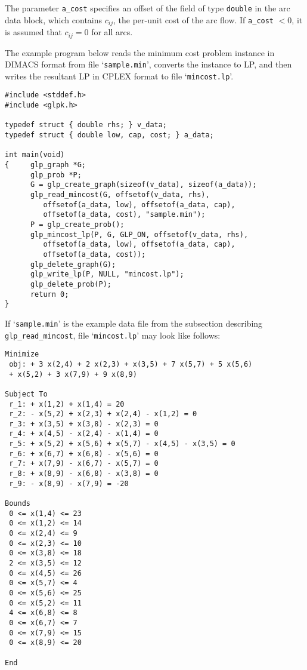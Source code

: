 \documentclass[11pt]{report}
\def\para#1{\noindent{\bf#1}}
\begin{document}
The parameter \verb|a_cost| specifies an offset of the field of type
\verb|double| in the arc data block, which contains $c_{ij}$, the
per-unit cost of the arc flow. If \verb|a_cost| $<0$, it is assumed that
$c_{ij}=0$ for all arcs.

\para{Example}

The example program below reads the minimum cost problem instance in
DIMACS format from file `\verb|sample.min|', converts the instance to
LP, and then writes the resultant LP in CPLEX format to file
`\verb|mincost.lp|'.

\begin{footnotesize}
\begin{verbatim}
#include <stddef.h>
#include <glpk.h>

typedef struct { double rhs; } v_data;
typedef struct { double low, cap, cost; } a_data;

int main(void)
{     glp_graph *G;
      glp_prob *P;
      G = glp_create_graph(sizeof(v_data), sizeof(a_data));
      glp_read_mincost(G, offsetof(v_data, rhs),
         offsetof(a_data, low), offsetof(a_data, cap),
         offsetof(a_data, cost), "sample.min");
      P = glp_create_prob();
      glp_mincost_lp(P, G, GLP_ON, offsetof(v_data, rhs),
         offsetof(a_data, low), offsetof(a_data, cap),
         offsetof(a_data, cost));
      glp_delete_graph(G);
      glp_write_lp(P, NULL, "mincost.lp");
      glp_delete_prob(P);
      return 0;
}
\end{verbatim}
\end{footnotesize}

If `\verb|sample.min|' is the example data file from the subsection
describing \verb|glp_read_mincost|, file `\verb|mincost.lp|' may look
like follows:

\begin{footnotesize}
\begin{verbatim}
Minimize
 obj: + 3 x(2,4) + 2 x(2,3) + x(3,5) + 7 x(5,7) + 5 x(5,6)
 + x(5,2) + 3 x(7,9) + 9 x(8,9)

Subject To
 r_1: + x(1,2) + x(1,4) = 20
 r_2: - x(5,2) + x(2,3) + x(2,4) - x(1,2) = 0
 r_3: + x(3,5) + x(3,8) - x(2,3) = 0
 r_4: + x(4,5) - x(2,4) - x(1,4) = 0
 r_5: + x(5,2) + x(5,6) + x(5,7) - x(4,5) - x(3,5) = 0
 r_6: + x(6,7) + x(6,8) - x(5,6) = 0
 r_7: + x(7,9) - x(6,7) - x(5,7) = 0
 r_8: + x(8,9) - x(6,8) - x(3,8) = 0
 r_9: - x(8,9) - x(7,9) = -20

Bounds
 0 <= x(1,4) <= 23
 0 <= x(1,2) <= 14
 0 <= x(2,4) <= 9
 0 <= x(2,3) <= 10
 0 <= x(3,8) <= 18
 2 <= x(3,5) <= 12
 0 <= x(4,5) <= 26
 0 <= x(5,7) <= 4
 0 <= x(5,6) <= 25
 0 <= x(5,2) <= 11
 4 <= x(6,8) <= 8
 0 <= x(6,7) <= 7
 0 <= x(7,9) <= 15
 0 <= x(8,9) <= 20

End
\end{verbatim}
\end{footnotesize}
\end{document}
